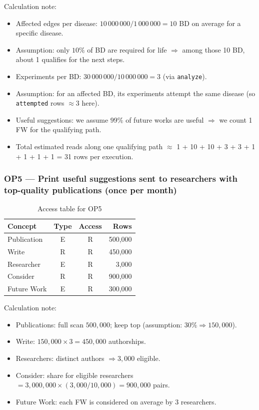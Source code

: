 \documentclass[11pt,a4paper]{article}
\begin{document}
Calculation note:
\begin{itemize}
  \item Affected edges per disease: $10\,000\,000 / 1\,000\,000 = 10$ BD on average for a specific disease.
  \item Assumption: only $10\%$ of BD are required for life $\Rightarrow$ among those 10 BD, about 1 qualifies for the next steps.
  \item Experiments per BD: $30\,000\,000 / 10\,000\,000 = 3$ (via \texttt{analyze}).
  \item Assumption: for an affected BD, its experiments attempt the same disease (so \texttt{attempted} rows $\approx 3$ here).
  \item Useful suggestions: we assume $99\%$ of future works are useful $\Rightarrow$ we count 1 FW for the qualifying path.
  \item Total estimated reads along one qualifying path $\approx$ 1 + 10 + 10 + 3 + 3 + 1 + 1 + 1 + 1 = 31 rows per execution.
\end{itemize}

\subsubsection*{OP5 — Print useful suggestions sent to researchers with top-quality publications (once per month)}
\begin{table}[H]
\centering
\begin{tabular}{|l|c|c|r|}
\hline
\textbf{Concept} & \textbf{Type} & \textbf{Access} & \textbf{Rows} \\
\hline
Publication & E & R & 500,000 \\
Write & R & R & 450,000 \\
Researcher  & E & R & 3,000 \\
Consider & R & R & 900,000 \\
Future Work & E & R & 300,000 \\
\hline
\end{tabular}
\caption{Access table for OP5}
\end{table}

Calculation note:
\begin{itemize}
  \item Publications: full scan $500{,}000$; keep top (assumption: $30\% \Rightarrow 150{,}000$).
  \item Write: $150{,}000 \times 3 = 450{,}000$ authorships.
  \item Researchers: distinct authors $\Rightarrow 3{,}000$ eligible.
  \item Consider: share for eligible researchers $= 3{,}000{,}000 \times (3{,}000/10{,}000) = 900{,}000$ pairs.
  \item Future Work: each FW is considered on average by 3 researchers.
\end{itemize}
\end{document}
